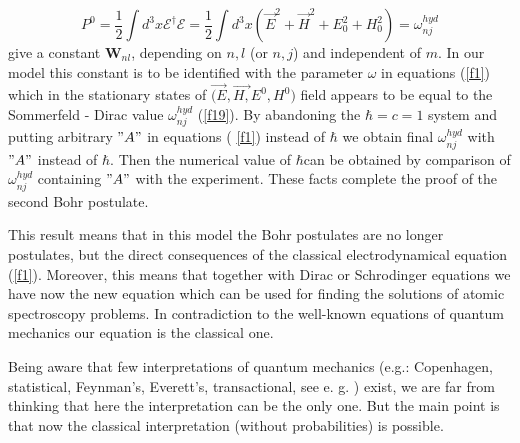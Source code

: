 \documentclass[a4paper,12pt]{article}
\begin{document}
\begin{equation}
P^0=\frac 12\int d^3x\mathcal{E}^{\dagger }\mathcal{E}=\frac 12\int d^3x(%
\overrightarrow{E}^2+\overrightarrow{H}^2+E_0^2+H_0^2)=\omega _{nj}^{hyd}
\label{f25}
\end{equation}
give a constant $\mathbf{W}_{nl}$, depending on $n,l$ (or $n,j$) and
independent of $m$. In our model this constant is to be identified with the
parameter $\omega $ in equations (\ref{f1}) which in the stationary states
of $\overrightarrow{(E},\overrightarrow{H,}E^0,H^0)$ field appears to be
equal to the Sommerfeld - Dirac value $\omega _{nj}^{hyd}$ (\ref{f19}). By
abandoning the $\hbar =c=1$ system and putting arbitrary $"A"$ in equations (%
\ref{f1}) instead of $\hbar $ we obtain final $\omega _{nj}^{hyd}$ with $"A"$
instead of $\hbar $. Then the numerical value of $\hbar $can be obtained by
comparison of $\omega _{nj}^{hyd}$ containing $"A"$ with the experiment.
These facts complete the proof of the second Bohr postulate.

This result means that in this model the Bohr postulates are no longer
postulates, but the direct consequences of the classical electrodynamical
equation (\ref{f1}). Moreover, this means that together with Dirac or
Schrodinger equations we have now the new equation which can be used for
finding the solutions of atomic spectroscopy problems. In contradiction to
the well-known equations of quantum mechanics our equation is the classical
one.

Being aware that few interpretations of quantum mechanics (e.g.: Copenhagen,
statistical, Feynman's, Everett's, transactional, see e. g. \cite{JC})
exist, we are far from thinking that here the interpretation can be the only
one. But the main point is that now the classical interpretation (without
probabilities) is possible.
\end{document}
